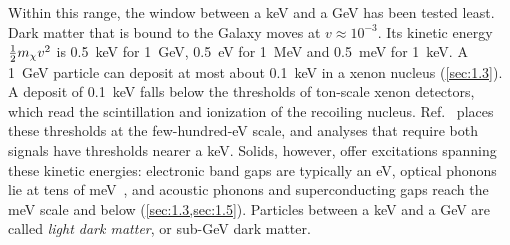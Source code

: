 Within this range, the window between a keV and a GeV has been tested least. Dark matter that is bound to the Galaxy moves at $v \approx 10^{-3}$. Its kinetic energy $\frac12 m_{\chi} v^2$ is \SI{0.5}{keV} for \SI{1}{GeV}, \SI{0.5}{eV} for \SI{1}{MeV} and \SI{0.5}{meV} for \SI{1}{keV}. A \SI{1}{GeV} particle can deposit at most about \SI{0.1}{keV} in a xenon nucleus (\cref{sec:1.3}). A deposit of \SI{0.1}{keV} falls below the thresholds of ton-scale xenon detectors, which read the scintillation and ionization of the recoiling nucleus. Ref.~\cite[Sect.~I]{kahn2022searches} places these thresholds at the few-hundred-eV scale, and analyses that require both signals have thresholds nearer a keV. Solids, however, offer excitations spanning these kinetic energies: electronic band gaps are typically an eV, optical phonons lie at tens of meV~\cite[Table~I]{kahn2022searches}, and acoustic phonons and superconducting gaps reach the meV scale and below (\cref{sec:1.3,sec:1.5}). Particles between a keV and a GeV are called \emph{light dark matter}, or sub-GeV dark matter.
